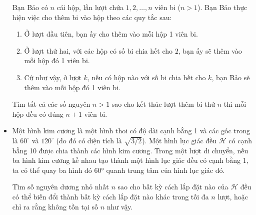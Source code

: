 \documentclass[11pt]{scrartcl}
\begin{document}
\begin{itemize}[label=, leftmargin=0em, itemsep=-0em]
\begin{btvn}
        Bạn Bảo có $n$ cái hộp, lần lượt chứa $1,2,\dots,n$ viên bi ($n > 1$). Bạn Bảo thực hiện việc cho thêm bi vào hộp theo các quy tắc sau:
        \begin{enumerate}
            \item Ở lượt đầu tiên, bạn ấy cho thêm vào mỗi hộp 1 viên bi.
            \item Ở lượt thứ hai, với các hộp có số bi chia hết cho $2$, bạn ấy sẽ thêm vào mỗi hộp đó 1 viên bi.
            \item Cứ như vậy, ở lượt $k$, nếu có hộp nào với số bi chia hết cho $k$, bạn Bảo sẽ thêm vào mỗi hộp đó 1 viên bi.
        \end{enumerate}
        Tìm tất cả các số nguyên $n > 1$ sao cho kết thúc lượt thêm bi thứ $n$ thì mỗi hộp đều có đúng $n + 1$ viên bi.
    \end{btvn}
    \item \begin{btvn}
        Một hình kim cương là một hình thoi có độ dài cạnh bằng 1 và các góc trong là $60^\circ$ và $120^\circ$ (do đó có diện tích là $\sqrt{3/2}$). Một hình lục giác đều $\mathcal{H}$ có cạnh bằng 10 được chia thành các hình kim cương. Trong một lượt di chuyển, nếu ba hình kim cương kề nhau tạo thành một hình lục giác đều có cạnh bằng 1, ta có thể quay ba hình đó 60° quanh trung tâm của hình lục giác đó.

Tìm số nguyên dương nhỏ nhất $n$ sao cho bất kỳ cách lắp đặt nào của $\mathcal{H}$ đều có thể biến đổi thành bất kỳ cách lắp đặt nào khác trong tối đa $n$ lượt, hoặc chỉ ra rằng không tồn tại số $n$ như vậy.
    \end{btvn}


\end{itemize}
\end{document}

